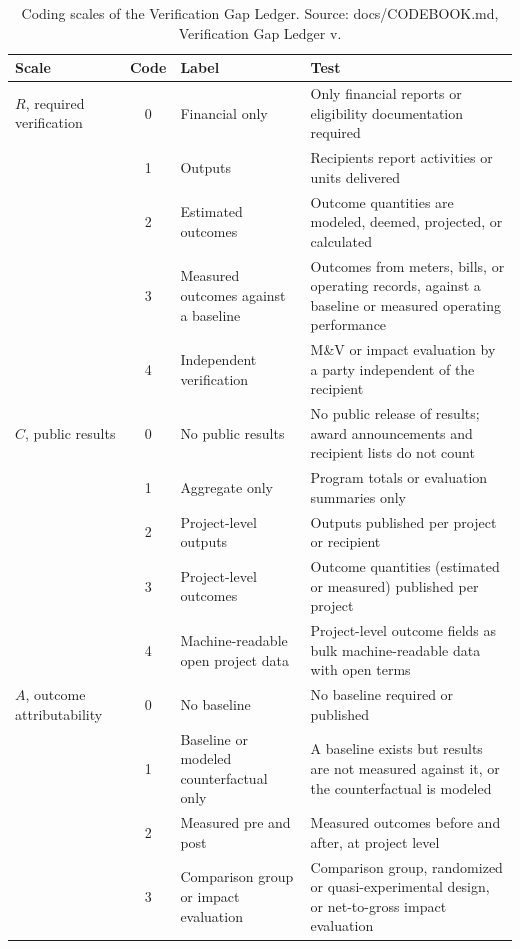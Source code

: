 \documentclass[10pt,twocolumn,letterpaper]{article}
\begin{document}
\begin{table}[t]
\caption{Coding scales of the Verification Gap Ledger. Source: docs/CODEBOOK.md, Verification Gap Ledger v\vglVersion.}
\label{tab:scales}
\footnotesize
\begin{tabularx}{\textwidth}{L{2.6cm} c L{3.6cm} X}
\toprule
Scale & Code & Label & Test \\
\midrule
$R$, required verification & 0 & Financial only & Only financial reports or eligibility documentation required \\
 & 1 & Outputs & Recipients report activities or units delivered \\
 & 2 & Estimated outcomes & Outcome quantities are modeled, deemed, projected, or calculated \\
 & 3 & Measured outcomes against a baseline & Outcomes from meters, bills, or operating records, against a baseline or measured operating performance \\
 & 4 & Independent verification & M\&V or impact evaluation by a party independent of the recipient \\
\midrule
$C$, public results & 0 & No public results & No public release of results; award announcements and recipient lists do not count \\
 & 1 & Aggregate only & Program totals or evaluation summaries only \\
 & 2 & Project-level outputs & Outputs published per project or recipient \\
 & 3 & Project-level outcomes & Outcome quantities (estimated or measured) published per project \\
 & 4 & Machine-readable open project data & Project-level outcome fields as bulk machine-readable data with open terms \\
\midrule
$A$, outcome attributability & 0 & No baseline & No baseline required or published \\
 & 1 & Baseline or modeled counterfactual only & A baseline exists but results are not measured against it, or the counterfactual is modeled \\
 & 2 & Measured pre and post & Measured outcomes before and after, at project level \\
 & 3 & Comparison group or impact evaluation & Comparison group, randomized or quasi-experimental design, or net-to-gross impact evaluation \\
\bottomrule
\end{tabularx}
\end{table}
\end{document}
